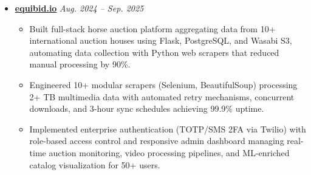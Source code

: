 \documentclass[A4,10pt]{article}
\begin{document}
\begin{itemize}[leftmargin=0in, label={}]
    \item \textbf{\href{https://github.com/b18050/visara}{ equibid.io}} \hfill \textit{Aug. 2024 -- Sep. 2025}
 \vspace{-1.5mm}
\begin{itemize}[leftmargin=0.25in]
    \item Built full-stack horse auction platform aggregating data from 10+ international auction houses using Flask, PostgreSQL, and Wasabi S3, 
    automating data collection with Python web scrapers that reduced manual processing by 90\%.
    \item Engineered 10+ modular scrapers (Selenium, BeautifulSoup) processing 2+ TB multimedia data with automated retry mechanisms, 
    concurrent downloads, and 3-hour sync schedules achieving 99.9\% uptime.
    \item Implemented enterprise authentication (TOTP/SMS 2FA via Twilio) with role-based access control and responsive admin dashboard managing
     real-time auction monitoring, video processing pipelines, and ML-enriched catalog visualization for 50+ users.
\end{itemize}



\end{itemize}

\end{document}
